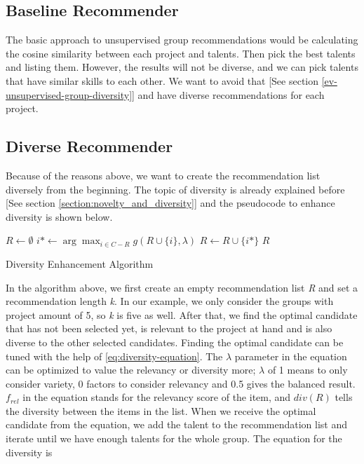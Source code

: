 \subsection{Baseline Recommender}

The basic approach to unsupervised group recommendations would be calculating the cosine similarity between each project and talents. Then pick the best talents and listing them. However, the results will not be diverse, and we can pick talents that have similar skills to each other. We want to avoid that [See section \ref{ev-unsupervised-group-diversity}] and have diverse recommendations for each project.


\subsection{Diverse Recommender}\label{implementation-diverse}

Because of the reasons above, we want to create the recommendation list diversely from the beginning. The topic of diversity is already explained before [See section \ref{section:novelty_and_diversity}] and the pseudocode to enhance diversity is shown below.

\begin{algorithm}
	\begin{algorithmic}
		\STATE $R\gets \emptyset$
		\STATE $i*\gets \arg \max _ { i \in C - R } g ( R \cup \{ i \} , \lambda )$
		\STATE $R\gets  R \cup \{ i * \} $
		\ENDWHILE
		\RETURN $R$
		\label{eq:diversity-enhancement}
	\end{algorithmic}
	\caption{Diversity Enhancement Algorithm}
\end{algorithm}


In the algorithm above, we first create an empty recommendation list \textit{R} and set a recommendation length \textit{k}. In our example, we only consider the groups with project amount of 5, so \textit{k} is five as well. After that, we find the optimal candidate that has not been selected yet, is relevant to the project at hand and is also diverse to the other selected candidates. Finding the optimal candidate can be tuned with the help of \eqref{eq:diversity-equation}. The $\lambda$ parameter in the equation can be optimized to value the relevancy or diversity more; $\lambda$ of 1 means to only consider variety, 0 factors to consider relevancy and 0.5 gives the balanced result. $f _ { r e l }$ in the equation stands for the relevancy score of the item, and $d i v ( R )$ tells the diversity between the items in the list. When we receive the optimal candidate from the equation, we add the talent to the recommendation list and iterate until we have enough talents for the whole group. The equation for the diversity is

